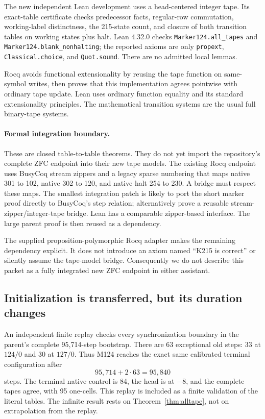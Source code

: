 \documentclass[11pt]{article}
\theoremstyle{remark}\newtheorem{remark}[theorem]{Remark}
\newcommand{\code}[1]{\texttt{\small #1}}
\begin{document}
The new independent Lean development uses a head-centered integer tape. Its exact-table certificate checks predecessor facts, regular-row commutation, working-label distinctness, the 215-state count, and closure of both transition tables on working states plus halt. Lean 4.32.0 checks \code{Marker124.all\_tapes} and \code{Marker124.blank\_nonhalting}; the reported axioms are only \code{propext}, \code{Classical.choice}, and \code{Quot.sound}. There are no admitted local lemmas.

Rocq avoids functional extensionality by reusing the tape function on same-symbol writes, then proves that this implementation agrees pointwise with ordinary tape update. Lean uses ordinary function equality and its standard extensionality principles. The mathematical transition systems are the usual full binary-tape systems.

\paragraph{Formal integration boundary.}
These are closed table-to-table theorems. They do not yet import the repository's complete ZFC endpoint into their new tape models. The existing Rocq endpoint uses BusyCoq stream zippers and a legacy sparse numbering that maps native 301 to 102, native 302 to 120, and native halt 254 to 230. A bridge must respect these maps. The smallest integration patch is likely to port the short marker proof directly to BusyCoq's step relation; alternatively prove a reusable stream-zipper/integer-tape bridge. Lean has a comparable zipper-based interface. The large parent proof is then reused as a dependency.

The supplied proposition-polymorphic Rocq adapter makes the remaining dependency explicit. It does not introduce an axiom named ``K215 is correct'' or silently assume the tape-model bridge. Consequently we do not describe this packet as a fully integrated new ZFC endpoint in either assistant.

\subsection{Initialization is transferred, but its duration changes}

An independent finite replay checks every synchronization boundary in the parent's complete 95,714-step bootstrap. There are 63 exceptional old steps: 33 at $124/0$ and 30 at $127/0$. Thus M124 reaches the exact same calibrated terminal configuration after
\[
 95,714+2\cdot63=95,840
\]
steps. The terminal native control is 84, the head is at $-8$, and the complete tapes agree, with 95 one-cells. This replay is included as a finite validation of the literal tables. The infinite result rests on Theorem~\ref{thm:alltape}, not on extrapolation from the replay.
\end{document}
